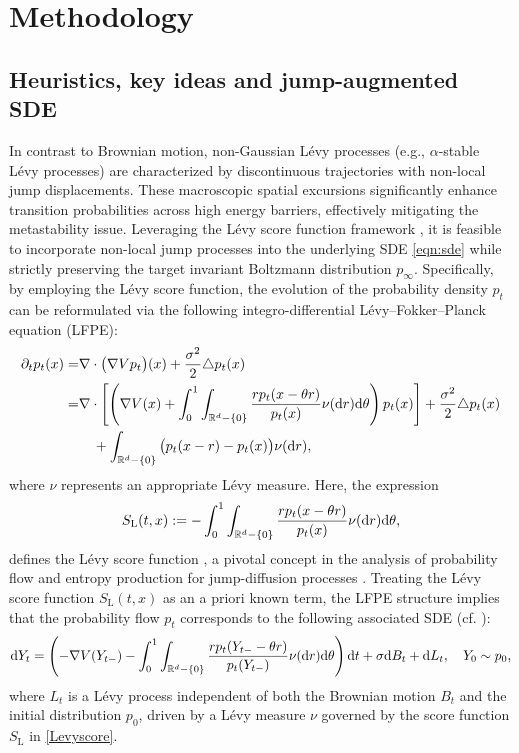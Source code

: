 \section{Methodology}\label{sec:method}


\subsection{Heuristics, key ideas and jump-augmented SDE}

In contrast to Brownian motion, non-Gaussian L\'{e}vy processes (e.g., $\alpha$-stable L\'{e}vy processes) are characterized by discontinuous trajectories with non-local jump displacements. These macroscopic spatial excursions significantly enhance transition probabilities across high energy barriers, effectively mitigating the metastability issue. Leveraging the L\'{e}vy score function framework \cite{huang2025probability,Huang2024LevyScore}, it is feasible to incorporate non-local jump processes into the underlying SDE \eqref{eqn:sde} while strictly preserving the target invariant Boltzmann distribution $p_\infty$. Specifically, by employing the L\'{e}vy score function, the evolution of the probability density $p_t$ can be reformulated via the following integro-differential L\'{e}vy--Fokker--Planck equation (LFPE):
\begin{equation}\label{eqn:LFPE}
    \begin{aligned}
        \partial_t p_t(x)  =& \nabla\cdot\big(\nabla V p_t\big)(x) + \frac{\sigma^2}{2} \triangle p_t(x)\\
        =& \nabla\cdot\left[\left(\nabla V(x) + \int_0^1\int_{\mathbb{R}^d-\{0\}} \frac{r p_t(x - \theta r)}{p_t(x)}\nu(\mathrm{d} r)\mathrm{d}\theta\right)p_t(x)\right] + \frac{\sigma^2}{2} \triangle p_t(x) \\
        &\quad + \int_{\mathbb{R}^d-\{0\}}\big(p_t(x-r) -p_t(x)\big)\nu(\mathrm{d} r),
    \end{aligned}
\end{equation}
where $\nu$ represents an appropriate L\'{e}vy measure. Here, the expression
\begin{equation}\label{Levyscore}
    S_\mathrm{L}(t,x):= -\int_0^1\int_{\mathbb{R}^d-\{0\}} \frac{r p_t(x - \theta r)}{p_t(x)}\nu(\mathrm{d} r)\mathrm{d}\theta,
\end{equation}
defines the L\'{e}vy score function \cite{Huang2024LevyScore}, a pivotal concept in the analysis of probability flow and entropy production  for jump-diffusion processes \cite{huang2025entropy}. Treating the L\'{e}vy score function $S_\mathrm{L}(t,x)$ as an a priori known term, the LFPE structure implies that the probability flow $p_t$ corresponds to the following associated SDE (cf. \cite[Theorem 2.3]{huang2025probability}):
\begin{equation}\label{eqn:sdeLevy}
    \mathrm{d} Y_t=\left(-\nabla V(Y_{t-}) - \int_0^1\int_{\mathbb{R}^d-\{0\}} \frac{r p_t(Y_{t-} - \theta r)}{p_t(Y_{t-})}\nu(\mathrm{d} r)\mathrm{d}\theta \right)\mathrm{d} t+ \sigma \mathrm{d} B_t + \mathrm{d} L_t,\quad Y_0\sim p_0,
\end{equation}
where $L_t$ is a L\'{e}vy process independent of both the Brownian motion $B_t$ and the initial distribution $p_0$, driven by a L\'{e}vy measure $\nu$ governed by the score function $S_\mathrm{L}$ in \eqref{Levyscore}.

